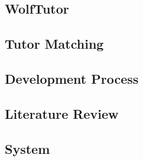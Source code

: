 \subsection{WolfTutor}
\label{sec:wolftutor}


\subsection{Tutor Matching}
\label{sec:tutor-matching}


\subsection{Development Process}
\label{sec:development-process}



\subsection{Literature Review}
\label{sec:literature-review}


\subsection{System}
\label{sec:system-uses}





